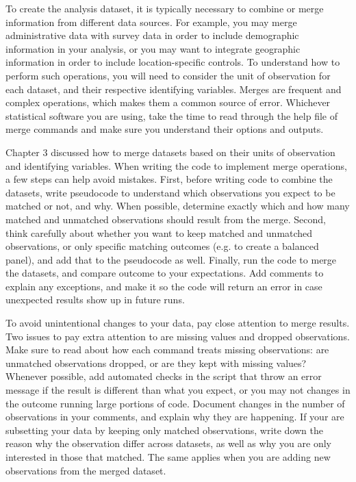 To create the analysis dataset,
it is typically necessary to combine or merge information
from different data sources.
For example, you may merge administrative data with survey data
in order to include demographic information in your analysis,
or you may want to integrate geographic information
in order to include location-specific controls.
To understand how to perform such operations,
you will need to consider the unit of observation for each dataset,
and their respective identifying variables.
Merges are frequent and complex operations,
which makes them a common source of error.
Whichever statistical software you are using,
take the time to read through the help file of merge commands
and make sure you understand their options and outputs.

Chapter 3 discussed how to merge datasets
based on their units of observation and identifying variables.
When writing the code to implement merge operations,
a few steps can help avoid mistakes.
First, before writing code to combine the datasets,
write pseudocode to understand which observations you expect to be
matched or not, and why.
When possible, determine exactly which and how many
matched and unmatched observations should result from the merge.
Second, think carefully about whether you want to keep matched and unmatched observations, 
or only specific matching outcomes (e.g. to create a balanced panel),
and add that to the pseudocode as well.
Finally, run the code to merge the datasets,
and compare outcome to your expectations.
Add comments to explain any exceptions,
and make it so the code will return an error in case unexpected results show up in future runs.

To avoid unintentional changes to your data,
pay close attention to merge results.
Two issues to pay extra attention to are missing values and dropped observations.
Make sure to read about how each command treats missing observations:
are unmatched observations dropped, or are they kept with missing values?
Whenever possible, add automated checks in the script that throw an error message
if the result is different than what you expect,
or you may not changes in the outcome running large portions of code.
Document changes in the number of observations in your comments,
and explain why they are happening.
If your are subsetting your data by keeping only matched observations,
write down the reason why the observation differ across datasets,
as well as why you are only interested in those that matched.
The same applies when you are adding new observations from the merged dataset.


